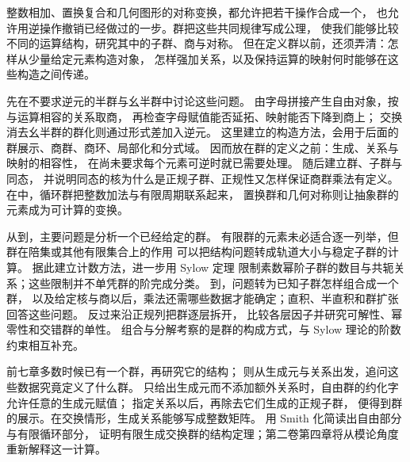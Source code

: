 
\BookPartGuide

整数相加、置换复合和几何图形的对称变换，都允许把若干操作合成一个， 也允许用逆操作撤销已经做过的一步。群把这些共同规律写成公理， 使我们能够比较不同的运算结构，研究其中的子群、商与对称。 但在定义群以前，还须弄清：怎样从少量给定元素构造对象， 怎样强加关系，以及保持运算的映射何时能够在这些构造之间传递。

\ProseParagraphBreak
{}先在不要求逆元的半群与幺半群中讨论这些问题。 由字母拼接产生自由对象，按与运算相容的关系取商， 再检查字母赋值能否延拓、映射能否下降到商上； 交换消去幺半群的群化则通过形式差加入逆元。 这里建立的构造方法，会用于后面的群展示、商群、商环、局部化和分式域。 因而放在群的定义之前：生成、关系与映射的相容性， 在尚未要求每个元素可逆时就已需要处理。 随后建立群、子群与同态， 并说明同态的核为什么是正规子群、正规性又怎样保证商群乘法有定义。 在中，循环群把整数加法与有限周期联系起来， 置换群和几何对称则让抽象群的元素成为可计算的变换。

\ProseParagraphBreak
从到，主要问题是分析一个已经给定的群。 有限群的元素未必适合逐一列举，但群在陪集或其他有限集合上的作用 可以把结构问题转成轨道大小与稳定子群的计算。 据此建立计数方法，进一步用 Sylow 定理 限制素数幂阶子群的数目与共轭关系；这些限制并不单凭群的阶完成分类。 到，问题转为已知子群怎样组合成一个群， 以及给定核与商以后，乘法还需哪些数据才能确定；直积、半直积和群扩张回答这些问题。 反过来沿正规列把群逐层拆开， 比较各层因子并研究可解性、幂零性和交错群的单性。 组合与分解考察的是群的构成方式，与 Sylow 理论的阶数约束相互补充。

\ProseParagraphBreak
前七章多数时候已有一个群，再研究它的结构； 则从生成元与关系出发，追问这些数据究竟定义了什么群。 只给出生成元而不添加额外关系时，自由群的约化字允许任意的生成元赋值； 指定关系以后，再除去它们生成的正规子群， 便得到群的展示。在交换情形，生成关系能够写成整数矩阵。 用 Smith 化简读出自由部分与有限循环部分， 证明有限生成交换群的结构定理；第二卷第四章将从模论角度重新解释这一计算。

